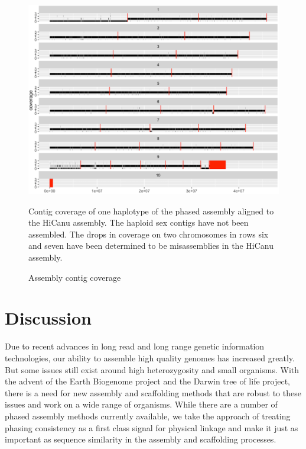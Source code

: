 {\begin{figure}[htbp!]
\caption{Assembly contig coverage}
\label{figure:contigcoverage}
\begin{centering}
\includegraphics[width=\textwidth]{assemblycontigcoverage.png}
\par{Contig coverage of one haplotype of the phased assembly aligned to the HiCanu assembly. The haploid sex contigs have not been assembled. The drops in coverage on two chromosomes in rows six and seven have been determined to be misassemblies in the HiCanu assembly. }
\end{centering}
\end{figure}



\section{Discussion}

\par{
Due to recent advances in long read and long range genetic information technologies, our ability to assemble high quality genomes has increased greatly. But some issues still exist around high heterozygosity and small organisms. With the advent of the Earth Biogenome project and the Darwin tree of life project, there is a need for new assembly and scaffolding methods that are robust to these issues and work on a wide range of organisms. While there are a number of phased assembly methods currently available, we take the approach of treating phasing consistency as a first class signal for physical linkage and make it just as important as sequence similarity in the assembly and scaffolding processes.
} \\

}
